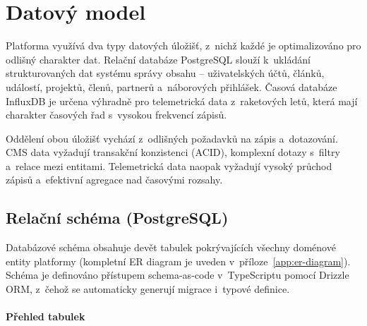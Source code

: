 \section{Datový model}

Platforma využívá dva typy datových úložišť, z~nichž každé je optimalizováno pro odlišný charakter dat. Relační databáze PostgreSQL slouží k~ukládání strukturovaných dat systému správy obsahu -- uživatelských účtů, článků, událostí, projektů, členů, partnerů a~náborových přihlášek. Časová databáze InfluxDB je určena výhradně pro telemetrická data z~raketových letů, která mají charakter časových řad s~vysokou frekvencí zápisů.

Oddělení obou úložišť vychází z~odlišných požadavků na zápis a~dotazování. CMS data vyžadují transakční konzistenci (ACID), komplexní dotazy s~filtry a~relace mezi entitami. Telemetrická data naopak vyžadují vysoký průchod zápisů a~efektivní agregace nad časovými rozsahy.

\subsection{Relační schéma (PostgreSQL)}

Databázové schéma obsahuje devět tabulek pokrývajících všechny doménové entity platformy (kompletní ER diagram je uveden v~příloze~\ref{app:er-diagram}). Schéma je definováno přístupem schema-as-code v~TypeScriptu pomocí Drizzle ORM, z~čehož se automaticky generují migrace i~typové definice.

\paragraph{Přehled tabulek}

